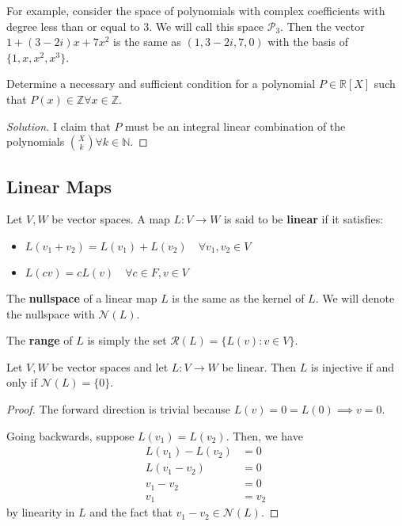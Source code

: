 For example, consider the space of polynomials with complex coefficients
with degree less than or equal to $3$. We will call this space
$\mathcal{P}_3$. Then the vector $1 + (3 - 2i)x + 7x^2$ is the same as
$(1, 3 - 2i, 7, 0)$ with the basis of $\lbrace 1, x, x^2, x^3 \rbrace$.

\begin{prb}
Determine a necessary and sufficient condition for a polynomial $P \in
\mathbb{R}[X]$ such that $P(x) \in \mathbb{Z} \forall x \in
\mathbb{Z}$.
\end{prb}

\begin{proof}[Solution]
I claim that $P$ must be an integral linear combination of the
polynomials $\binom{X}{k} \forall k \in \mathbb{N}$.
\end{proof}

\subsection{Linear Maps}
\begin{df}
Let $V, W$ be vector spaces.  A map $L : V \rightarrow W$ is said to be
\textbf{linear} if it satisfies:
\begin{itemize}
\item $L(v_1 + v_2) = L(v_1) + L(v_2) \quad \forall v_1, v_2 \in V$
\item $L(c v) = c L(v) \quad \forall c \in F, v \in V$
\end{itemize}
\end{df}

\begin{df}
The \textbf{nullspace} of a linear map $L$ is the same as the kernel of
$L$. We will denote the nullspace with $\mathcal{N}(L)$.
\end{df}

\begin{df}
The \textbf{range} of $L$ is simply the set $\mathcal{R}(L) = \lbrace
L(v) : v \in V \rbrace$.
\end{df}

\begin{prop}
Let $V, W$ be vector spaces and let $L : V \rightarrow W$ be linear.
Then $L$ is injective if and only if $\mathcal{N}(L) = \lbrace 0
\rbrace$.
\end{prop}

\begin{proof}
The forward direction is trivial because $L(v) = 0 = L(0) \implies v =
0$.

Going backwards, suppose $L(v_1) = L(v_2)$. Then, we have
\[ \begin{aligned}
L(v_1) - L(v_2) &= 0 \\
L(v_1 - v_2) &= 0 \\
v_1 - v_2 &= 0 \\
v_1 &= v_2
\end{aligned} \]
by linearity in $L$ and the fact that $v_1 - v_2 \in \mathcal{N}(L)$.
\end{proof}

